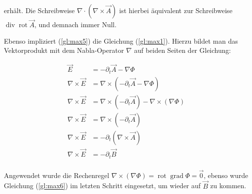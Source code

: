 erhält. Die Schreibweise $\nabla \cdot (\nabla\times\vec{A})$ ist hierbei äquivalent zur Schreibweise $\operatorname{div} \operatorname{rot} \vec{A}$, und demnach immer Null.

Ebenso impliziert (\ref{gl:max5}) die Gleichung (\ref{gl:max1}). Hierzu bildet man das Vektorprodukt mit dem Nabla-Operator $\nabla$ auf beiden Seiten der Gleichung:

\begin{align*}
\vec{E} &= -\partial_t\vec{A} - \nabla\Phi \\
\nabla \times \vec{E} &= \nabla \times (-\partial_t\vec{A} - \nabla\Phi) \\
\nabla \times \vec{E} &= \nabla \times (-\partial_t\vec{A}) - \nabla \times(\nabla\Phi) \\
\nabla \times \vec{E} &= \nabla \times (-\partial_t\vec{A}) \\
\nabla \times \vec{E} &= -\partial_t (\nabla \times \vec{A}) \\
\nabla \times \vec{E} &= -\partial_t \vec{B} \\
\end{align*}

Angewendet wurde die Rechenregel $\nabla \times(\nabla\Phi) = \operatorname{rot}\operatorname{grad}\Phi = \vec{0} $, ebenso wurde Gleichung (\ref{gl:max6}) im letzten Schritt eingesetzt, um wieder auf $\vec{B}$ zu kommen.

